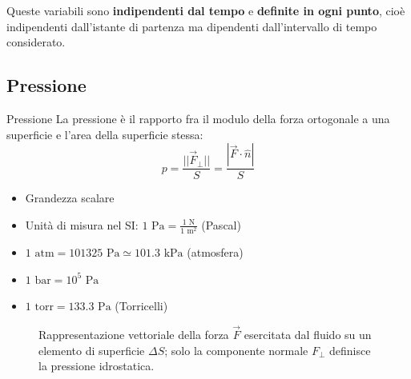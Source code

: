 Queste variabili sono \textbf{indipendenti dal tempo} e \textbf{definite in ogni punto}, cioè indipendenti dall'istante di partenza ma dipendenti dall'intervallo di tempo considerato.

\subsection{Pressione}
\begin{definizione}{Pressione}
La pressione è il rapporto fra il modulo della forza ortogonale a una superficie e l'area della superficie stessa:
\begin{equation}
p = \frac{||\vec{F}_{\perp}||}{S} = \frac{|\vec{F} \cdot \hat{n}|}{S}
\end{equation}
\end{definizione}

\medskip
\begin{itemize}
    \item Grandezza scalare
    \item Unità di misura nel SI: $1 \text{ Pa} = \frac{1 \text{ N}}{1 \text{ m}^2}$ (Pascal)
    \item $1 \text{ atm} = 101325 \text{ Pa} \simeq 101.3 \text{ kPa}$ (atmosfera)
    \item $1 \text{ bar} = 10^5 \text{ Pa}$
    \item $1 \text{ torr} = 133.3 \text{ Pa}$ (Torricelli)
\end{itemize}

\begin{figure}[ht]
\centering
{}
\caption{Rappresentazione vettoriale della forza $\vec{F}$ esercitata dal fluido su un elemento di superficie $\Delta S$; solo la componente normale $F_\perp$ definisce la pressione idrostatica.}
\end{figure}

